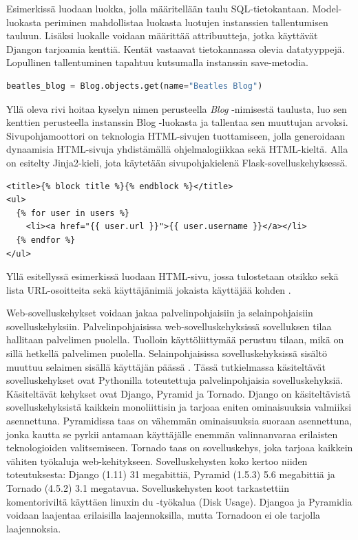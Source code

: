 \documentclass[utf8]{gradu3}
\begin{document}
Esimerkissä luodaan luokka, jolla määritellään taulu SQL-tietokantaan. Model-luokasta periminen mahdollistaa luokasta luotujen instanssien tallentumisen tauluun. Lisäksi
luokalle voidaan määrittää attribuutteja, jotka käyttävät Djangon tarjoamia kenttiä. Kentät vastaavat tietokannassa olevia datatyyppejä. Lopullinen tallentuminen
tapahtuu kutsumalla instanssin save-metodia.


\begin{lstlisting}[language=Python]
beatles_blog = Blog.objects.get(name="Beatles Blog")
\end{lstlisting}

Yllä oleva rivi hoitaa kyselyn nimen perusteella \emph{Blog} -nimisestä taulusta, luo sen kenttien perusteella instanssin Blog -luokasta ja tallentaa sen muuttujan arvoksi.
Sivupohjamoottori on teknologia HTML-sivujen tuottamiseen, jolla generoidaan dynaamisia HTML-sivuja yhdistämällä ohjelmalogiikkaa sekä HTML-kieltä. Alla on esitelty Jinja2-kieli, jota käytetään sivupohjakielenä Flask-sovelluskehyksessä.

\begin{lstlisting}[language=Smalltalk]
<title>{% block title %}{% endblock %}</title>
<ul>
  {% for user in users %}
	<li><a href="{{ user.url }}">{{ user.username }}</a></li>
  {% endfor %}
</ul>
\end{lstlisting}


Yllä esitellyssä esimerkissä luodaan HTML-sivu, jossa tulostetaan otsikko sekä lista URL-osoitteita sekä käyttäjänimiä jokaista käyttäjää kohden \parencite{jinja}.

Web-sovelluskehykset voidaan jakaa palvelinpohjaisiin ja selainpohjaisiin sovelluskehyksiin. Palvelinpohjaisissa web-sovelluskehyksissä sovelluksen tilaa hallitaan palvelimen puolella. Tuolloin käyttöliittymää perustuu tilaan, mikä on sillä hetkellä palvelimen puolella. Selainpohjaisissa sovelluskehyksissä sisältö muuttuu selaimen sisällä käyttäjän päässä \parencite{vosloo}. Tässä tutkielmassa käsiteltävät sovelluskehykset ovat Pythonilla toteutettuja palvelinpohjaisia sovelluskehyksiä. Käsiteltävät kehykset ovat Django, Pyramid ja Tornado. Django on käsiteltävistä sovelluskehyksistä kaikkein monoliittisin ja tarjoaa eniten ominaisuuksia valmiiksi asennettuna. Pyramidissa taas on vähemmän ominaisuuksia suoraan asennettuna, jonka kautta se pyrkii antamaan käyttäjälle enemmän valinnanvaraa erilaisten teknologioiden valitsemiseen. Tornado taas on sovelluskehys, joka tarjoaa kaikkein vähiten työkaluja web-kehitykseen. Sovelluskehysten koko kertoo niiden toteutuksesta: Django (1.11) 31 megabittiä, Pyramid (1.5.3) 5.6 megabittiä ja Tornado (4.5.2) 3.1 megatavua. Sovelluskehysten koot tarkastettiin komentoriviltä käyttäen linuxin du -työkalua (Disk Usage). Djangoa ja Pyramidia voidaan laajentaa erilaisilla laajennoksilla, mutta Tornadoon ei ole tarjolla laajennoksia. 
\end{document}
